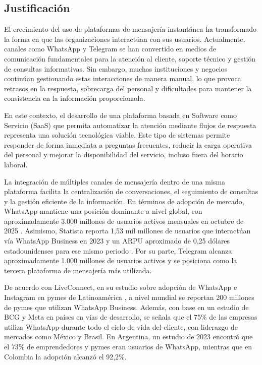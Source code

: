 \subsection{Justificación}
El crecimiento del uso de plataformas de mensajería instantánea ha transformado la forma en que las organizaciones interactúan con sus usuarios. Actualmente, canales como WhatsApp y Telegram se han convertido en medios de comunicación fundamentales para la atención al cliente, soporte técnico y gestión de consultas informativas. Sin embargo, muchas instituciones y negocios continúan gestionando estas interacciones de manera manual, lo que provoca retrasos en la respuesta, sobrecarga del personal y dificultades para mantener la consistencia en la información proporcionada.

En este contexto, el desarrollo de una plataforma basada en Software como Servicio (SaaS) que permita automatizar la atención mediante flujos de respuesta representa una solución tecnológica viable. Este tipo de sistemas permite responder de forma inmediata a preguntas frecuentes, reducir la carga operativa del personal y mejorar la disponibilidad del servicio, incluso fuera del horario laboral.

La integración de múltiples canales de mensajería dentro de una misma plataforma facilita la centralización de conversaciones, el seguimiento de consultas y la gestión eficiente de la información. En términos de adopción de mercado, WhatsApp mantiene una posición dominante a nivel global, con aproximadamente 3.000 millones de usuarios activos mensuales en octubre de 2025 \parencite{statista_messaging_2025}. Asimismo, Statista reporta 1,53 mil millones de usuarios que interactúan vía WhatsApp Business en 2023 y un ARPU aproximado de 0,25 dólares estadounidenses para ese mismo periodo \parencite{statista_whatsapp_business_2023}. Por su parte, Telegram alcanza aproximadamente 1.000 millones de usuarios activos y se posiciona como la tercera plataforma de mensajería más utilizada.

De acuerdo con LiveConnect, en su estudio sobre adopción de WhatsApp e Instagram en pymes de Latinoamérica \parencite{liveconnect_adopcion_2025}, a nivel mundial se reportan 200 millones de pymes que utilizan WhatsApp Business. Además, con base en un estudio de BCG y Meta en países en vías de desarrollo, se señala que el 75\% de las empresas utiliza WhatsApp durante todo el ciclo de vida del cliente, con liderazgo de mercados como México y Brasil. En Argentina, un estudio de 2023 encontró que el 73\% de emprendedores y pymes eran usuarios de WhatsApp, mientras que en Colombia la adopción alcanzó el 92,2\%.

